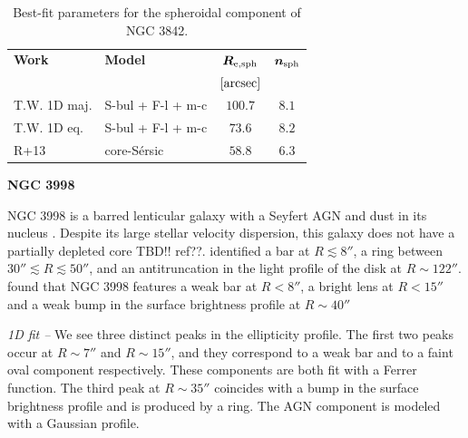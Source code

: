 \documentclass[preprint2]{emulateapj}
\begin{document}
  \begin{table}[h]
  \small
  \caption{Best-fit parameters for the spheroidal component of NGC 3842.}
  \begin{center}
  \begin{tabular}{llcc}
  \hline
  {\bf Work} & {\bf Model}   & $\bm R_{\rm e,sph}$    & $\bm n_{\rm sph}$ \\
    &  &  $[\rm arcsec]$ & \\
  \hline
  T.W. 1D maj. & S-bul + F-l + m-c  & $100.7$  &  $8.1$ \\
  T.W. 1D eq.  & S-bul + F-l + m-c  & $73.6$   &  $8.2$ \\
  \hline
  R+13         & core-S\'ersic & $58.8$  &  $6.3$ \\
  \hline
  \end{tabular}
  \end{center}
  \label{tab:n3842}
  \end{table}  


  \clearpage\newpage\noindent
  {\bf NGC 3998 \\}

  NGC 3998 is a barred lenticular galaxy with a Seyfert AGN and dust in its nucleus \citep{knapp1996n3998}.
  Despite its large stellar velocity dispersion, this galaxy does not have a partially depleted core TBD!! ref??. 
  \cite{gutierrez2011} identified a bar at $R \lesssim 8''$, a ring between $30'' \lesssim R \lesssim 50''$, and  
  an antitruncation in the light profile of the disk at $R \sim 122''$.
  \cite{laurikainen2010} found that NGC 3998 features a weak bar at $R < 8''$,
  a bright lens at $R < 15''$ and a weak bump in the surface brightness profile at $R \sim 40''$ 

  \emph{1D fit -- }
  We see three distinct peaks in the ellipticity profile.
  The first two peaks occur at $R \sim 7''$ and $R \sim 15''$, and they correspond to a weak bar and to a faint 
  oval component respectively.
  These components are both fit with a Ferrer function.
  The third peak at $R \sim 35''$ coincides with a bump in the surface brightness profile and is produced by a ring.
  The AGN component is modeled with a Gaussian profile.
\end{document}
